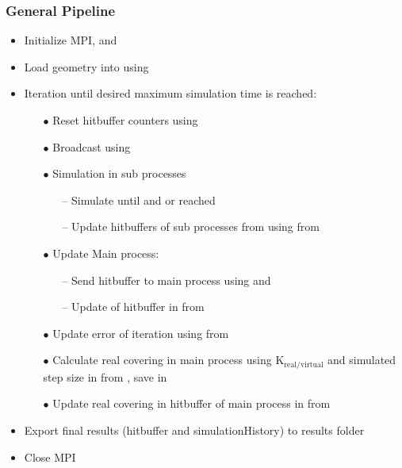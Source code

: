 \subsubsection{General Pipeline}
\begin{itemize}[noitemsep,topsep=0pt, partopsep=0pt]
\item Initialize MPI,  and 
\item Load geometry into  using 
\item Iteration until desired maximum simulation time is reached: \smallskip
	\begin{itemize}[noitemsep,topsep=0pt, partopsep=0pt]
	\item[$\bullet$] Reset hitbuffer counters using 
	\item[$\bullet$] Broadcast  using 
	\item[$\bullet$] Simulation in sub processes
	\begin{itemize}[noitemsep,topsep=0pt, partopsep=0pt]
	\item[--] Simulate until  and  or  reached
	\item[--] Update hitbuffers of sub processes from  using  from 
	\end{itemize}
	\item[$\bullet$] Update Main process:
		\begin{itemize}[noitemsep,topsep=0pt, partopsep=0pt]
		\item[--] Send hitbuffer to main process using  and 
		\item[--] Update of hitbuffer in  from 
		\end{itemize}
	\item[$\bullet$] Update error of iteration using  from 
	\item[$\bullet$] Calculate real covering in main process using $\text{K}_{\text{real}/\text{virtual}}$ and simulated step size in  from , save in 
	\item[$\bullet$] Update real covering in hitbuffer of main process in  from 
	\end{itemize}\smallskip
\item Export final results (hitbuffer and simulationHistory) to results folder
\item Close MPI
\end{itemize}
\newpage






